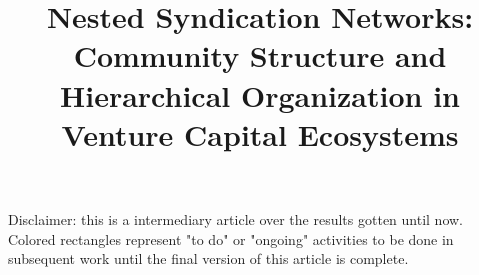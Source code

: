 \documentclass[12pt]{article}
\begin{document}
\title{Nested Syndication Networks: Community Structure and Hierarchical Organization in Venture Capital Ecosystems}
\author{}
\date{}
\maketitle

Disclaimer: this is a intermediary article over the results gotten until now. Colored rectangles represent "to do" or "ongoing" activities to be done in subsequent work until the final version of this article is complete.
\newpage


\newpage

\tableofcontents
\newpage


\newpage


\newpage


\newpage


\newpage


\newpage



\end{document}
